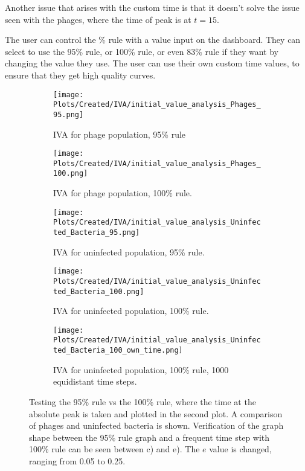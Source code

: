 Another issue that arises with the custom time is that it doesn't solve the issue seen with the phages, where the time of peak is at $t=15$. 

The user can control the \% rule with a value input on the dashboard. 
They can select to use the 95\% rule, or 100\% rule, or even 83\% rule if they want by changing the value they use. 
The user can use their own custom time values, to ensure that they get high quality curves. 

\begin{figure}
    \centering
    \begin{subfigure}{1\linewidth}
        \centering
        \texttt{[image: Plots/Created/IVA/initial\_value\_analysis\_Phages\_95.png]}
        \caption{
            IVA for phage population, 95\% rule
        }
        \label{fig:appendixF:IVA_phage_95}
    \end{subfigure}
    \hfill
    \begin{subfigure}{1\linewidth}
        \centering
        \texttt{[image: Plots/Created/IVA/initial\_value\_analysis\_Phages\_100.png]}
        \caption{
            IVA for phage population, 100\% rule.  
        }
        \label{fig:appendixF:IVA_phages_100}
    \end{subfigure}
    \hfill
    \begin{subfigure}{1\linewidth}
        \centering
        \texttt{[image: Plots/Created/IVA/initial\_value\_analysis\_Uninfected\_Bacteria\_95.png]}
        \caption{
            IVA for uninfected population, 95\% rule. 
        }
        \label{fig:appendixF:IVA_uninfected_bacteria_95}
    \end{subfigure}
    \hfill 
    \begin{subfigure}{1\linewidth}
        \centering
        \texttt{[image: Plots/Created/IVA/initial\_value\_analysis\_Uninfected\_Bacteria\_100.png]}
        \caption{
            IVA for uninfected population, 100\% rule. 
        }
        \label{fig:appendixF:IVA_uninfected_bacteria_100}
    \end{subfigure}
    \begin{subfigure}{1\linewidth}
        \centering
        \texttt{[image: Plots/Created/IVA/initial\_value\_analysis\_Uninfected\_Bacteria\_100\_own\_time.png]}
        \caption{
            IVA for uninfected population, 100\% rule, 1000 equidistant time steps. 
        }
        \label{fig:appendixF:IVA_uninfected_bacteria_100_own_time}
    \end{subfigure}
    \caption{
        Testing the 95\% rule vs the 100\% rule, where the time at the absolute peak is taken and plotted in the second plot. 
        A comparison of phages and uninfected bacteria is shown. 
        Verification of the graph shape between the 95\% rule graph and a frequent time step with 100\% rule can be seen between c) and e). 
        The $e$ value is changed, ranging from 0.05 to 0.25. 
    }
    \label{fig:appendixF:IVA_95_vs_100}
\end{figure}

